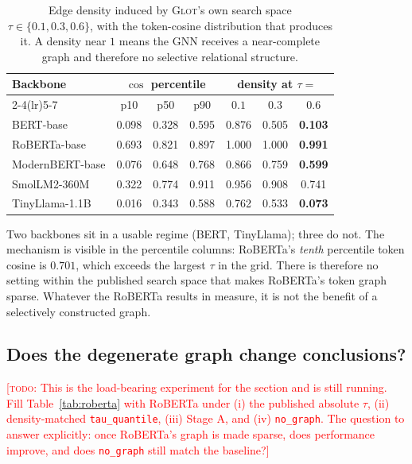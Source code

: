 \documentclass{article} %
\newcommand{\TODO}[1]{\textcolor{red}{[\textsc{todo}: #1]}}
\begin{document}
\begin{table}[t]
\caption{Edge density induced by \textsc{Glot}'s own search space
$\tau \in \{0.1, 0.3, 0.6\}$, with the token-cosine distribution that produces
it. A density near $1$ means the GNN receives a near-complete graph and
therefore no selective relational structure.}
\label{tab:density}
\begin{center}
\begin{tabular}{lcccccc}
\toprule
\multirow{2}{*}{Backbone} & \multicolumn{3}{c}{$\cos$ percentile} &
\multicolumn{3}{c}{density at $\tau =$} \\
\cmidrule(lr){2-4}\cmidrule(lr){5-7}
 & p10 & p50 & p90 & $0.1$ & $0.3$ & $0.6$ \\
\midrule
BERT-base        & 0.098 & 0.328 & 0.595 & 0.876 & 0.505 & \textbf{0.103} \\
RoBERTa-base     & 0.693 & 0.821 & 0.897 & 1.000 & 1.000 & \textbf{0.991} \\
ModernBERT-base  & 0.076 & 0.648 & 0.768 & 0.866 & 0.759 & \textbf{0.599} \\
SmolLM2-360M     & 0.322 & 0.774 & 0.911 & 0.956 & 0.908 & 0.741 \\
TinyLlama-1.1B   & 0.016 & 0.343 & 0.588 & 0.762 & 0.533 & \textbf{0.073} \\
\bottomrule
\end{tabular}
\end{center}
\end{table}

Two backbones sit in a usable regime (BERT, TinyLlama); three do not. The
mechanism is visible in the percentile columns: RoBERTa's \emph{tenth}
percentile token cosine is $0.701$, which exceeds the largest $\tau$ in the
grid. There is therefore no setting within the published search space that
makes RoBERTa's token graph sparse. Whatever the RoBERTa results in
\citet{mantri2026glot} measure, it is not the benefit of a selectively
constructed graph.

\subsection{Does the degenerate graph change conclusions?}

\TODO{This is the load-bearing experiment for the section and is still running.
Fill Table~\ref{tab:roberta} with RoBERTa under (i) the published absolute
$\tau$, (ii) density-matched \texttt{tau\_quantile}, (iii) Stage A, and
(iv) \texttt{no\_graph}. The question to answer explicitly: once RoBERTa's
graph is made sparse, does performance improve, and does \texttt{no\_graph}
still match the baseline?}
\end{document}
